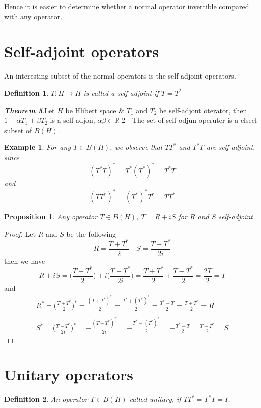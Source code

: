 \documentclass{report}
\newtheorem{defn}{Definition}
\newtheorem{exm}{Example}
\newtheorem{prop}{Proposition}
\begin{document}
Hence it is easier to determine whether a normal operator invertible compared with any operator.

\section{Self-adjoint operators}
An interesting subset of the normal operators is the self-adjoint operators.

\begin{defn}
$T: H \rightarrow H$ is called a self-adjoint if $T=T^{*}$
\end{defn}

\textbf{\textit{Theorem 5}}.Let $H$ be Hlibert space \& $T_{1}$ and $T_{2}$ be self-adjont oterator, then $1-\alpha T_{1}+\beta T_{2}$ is a self-adjon, $\alpha \beta \in \mathbb{R}$ 2 - The set of self-odjun operuter is a clseel subset of $B(H)$.

\begin{exm}
For any $T \in B(H)$, we observe that $T T^{*}$ and $T^{*} T$ are self-adjoint, since
$$
(T^{*}T)^{*} = T^{*}(T^{*})^{*} = T^{*}T
$$
and
$$
(TT^{*})^{*} = (T^{*})^{*}T^{*} = TT^{*}
$$
\end{exm}

\begin{prop}
Any operator $T \in B(H)$, $T=R+i S$ for $R$ and $S$ self-adjoint
\end{prop}
\begin{proof}
  Let $R$ and $S$ be the following
  $$
  R=\frac{T+T^{*}}{2}\quad S=\frac{T-T^{*}}{2i}
  $$
  then we have
  $$
  R+iS = \Big(\frac{T+T^{*}}{2}\Big)+i\Big(\frac{T-T^{*}}{2i}\Big) = \frac{T+T^{*}}{2}+\frac{T-T^{*}}{2} = \frac{2T}{2} = T
  $$
  and
  $$
  \begin{aligned}
    R^{*} = \Big(\frac{T+T^{*}}{2}\Big)^{*} = \frac{(T+T^{*})^{*}}{2} = \frac{T^{*}+(T^{*})^{*}}{2} = \frac{T^{*}+T}{2} = \frac{T+T^{*}}{2} = R \\ \\
    S^{*} = \Big(\frac{T-T^{*}}{2i}\Big)^{*} = -\frac{(T-T^{*})^{*}}{2i} = -\frac{T^{*}-(T^{*})^{*}}{2} = -\frac{T^{*}-T}{2} = \frac{T-T^{*}}{2} = S
  \end{aligned}
  $$
\end{proof}

\section{Unitary operators}

\begin{defn}
An operator $T \in B(H)$ called unitary, if $TT^{*}=T^{*}T=I$.
\end{defn}
\end{document}
